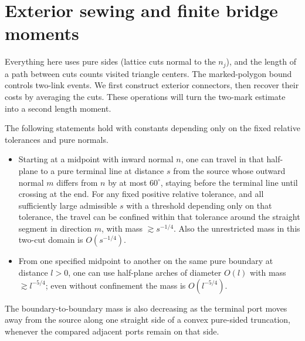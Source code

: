 \section{Exterior sewing and finite bridge moments}\label{sec:sewing}

Everything here uses pure sides (lattice cuts normal to the \(n_j\)), and the length of a path between cuts counts visited triangle centers. The marked-polygon bound controls two-link events. We first construct exterior connectors, then recover their costs by averaging the cuts. These operations will turn the two-mark estimate into a second length moment.

\begin{proposition}\label{prop:corridors}
The following statements hold with constants depending only on the fixed relative tolerances and pure normals.

\begin{itemize}

\item 

Starting at a midpoint with inward normal \(n\), one can travel in that half-plane to a pure terminal line at distance \(s\) from the source whose outward normal \(m\) differs from \(n\) by at most \(60^\circ\), staying before the terminal line until crossing at the end. For any fixed positive relative tolerance, and all sufficiently large admissible \(s\) with a threshold depending only on that tolerance, the travel can be confined within that tolerance around the straight segment in direction \(m\), with mass \(\gtrsim s^{-1/4}\). Also the unrestricted mass in this two-cut domain is \(O(s^{-1/4})\).

\item 

From one specified midpoint to another on the same pure boundary at distance \(l>0\), one can use half-plane arches of diameter \(O(l)\) with mass \(\gtrsim l^{-5/4}\); even without confinement the mass is \(O(l^{-5/4})\).

\end{itemize}
The boundary-to-boundary mass is also decreasing as the terminal port moves away from the source along one straight side of a convex pure-sided truncation, whenever the compared adjacent ports remain on that side.
\end{proposition}
